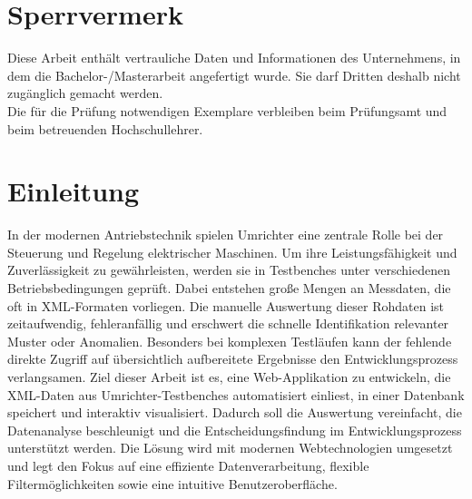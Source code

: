 \documentclass[
pagesize,				%
a4paper,				%
oneside,				%
headsepline,		    %
11pt,					%
halfparskip,		    %
final,					%
listof=totoc,		    %
]{scrartcl}			    %
\begin{document}
\newpage
\section*{Sperrvermerk}
\thispagestyle{empty}
Diese Arbeit enthält vertrauliche Daten und Informationen des Unternehmens, in dem die Bachelor-/Masterarbeit angefertigt wurde.
Sie darf Dritten deshalb nicht zugänglich gemacht werden. \\
Die für die Prüfung notwendigen Exemplare verbleiben beim Prüfungsamt und beim betreuenden Hochschullehrer.
\newpage




\renewcommand{\thesection}{\roman{section}}
\ohead[\pagemark]{}


\singlespacing
\renewcommand{\contentsname}{Inhaltsverzeichnis}
\addtocounter{section}{1}
\setcounter{page}{2}
\clearscrheadings
\clearscrplain
\clearscrheadfoot
\ohead[\pagemark]{\pagemark}
\ihead[\headmark]{\headmark}
\tableofcontents
\pagebreak

\listoffigures
\pagebreak

\listoftables
\pagebreak


\renewcommand{\sectionmark}[1]{\markright{#1}}
\renewcommand{\subsectionmark}[1]{}
\renewcommand{\subsubsectionmark}[1]{}
\onehalfspacing
\renewcommand{\thesection}{\arabic{section}}
\setcounter{section}{0}
\setcounter{page}{1}



\newpage
\section{Einleitung}
\label{Einleitung}
In der modernen Antriebstechnik spielen Umrichter eine zentrale Rolle bei der Steuerung und Regelung elektrischer Maschinen.
Um ihre Leistungsfähigkeit und Zuverlässigkeit zu gewährleisten, werden sie in Testbenches unter verschiedenen Betriebsbedingungen geprüft.
Dabei entstehen große Mengen an Messdaten, die oft in XML-Formaten vorliegen.
Die manuelle Auswertung dieser Rohdaten ist zeitaufwendig, fehleranfällig und erschwert die schnelle Identifikation relevanter Muster oder Anomalien.
Besonders bei komplexen Testläufen kann der fehlende direkte Zugriff auf übersichtlich aufbereitete Ergebnisse den Entwicklungsprozess verlangsamen.
Ziel dieser Arbeit ist es, eine Web-Applikation zu entwickeln, die XML-Daten aus Umrichter-Testbenches automatisiert einliest, in einer Datenbank speichert und interaktiv visualisiert.
Dadurch soll die Auswertung vereinfacht, die Datenanalyse beschleunigt und die Entscheidungsfindung im Entwicklungsprozess unterstützt werden.
Die Lösung wird mit modernen Webtechnologien umgesetzt und legt den Fokus auf eine effiziente Datenverarbeitung, flexible Filtermöglichkeiten sowie eine intuitive Benutzeroberfläche.
\end{document}
